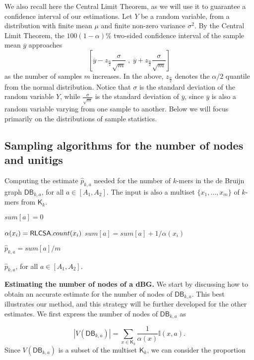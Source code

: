 \documentclass[a4paper,11pt]{article}
\newcommand{\DB}{\mathsf{DB}_{k,a}}
\newcommand{\K}{\mathsf{K}}
\newcommand{\abu}{\alpha}
\newcommand{\RLCSA}{{\sf RLCSA}}
\begin{document}
We also recall here the Central Limit Theorem, as we will use it to guarantee a confidence interval of our estimations. Let $Y$ be a random variable, from a distribution with finite mean $\mu$ and finite non-zero variance $\sigma^2$. By the Central Limit Theorem, the $100(1-\alpha)\%$ two-sided confidence interval of the sample mean $\overline{y}$ approaches 
\[\left[\overline{y} - z_{\frac{\alpha}{2}}\frac{\sigma}{\sqrt{m}} \;, \; \overline{y} + z_{\frac{\alpha}{2}}\frac{\sigma}{\sqrt{m}}\right] \]
as the number of samples $m$ increases. In the above, $z_{\frac{\alpha}{2}}$ denotes the $\alpha/2$ quantile from the normal distribution. Notice that $\sigma$ is the standard deviation of the random variable $Y$, while $\frac{\sigma}{\sqrt{m}}$ is the standard deviation of $\overline{y}$, since $\overline{y}$ is also a random variable varying from one sample to another. Below we will focus primarily on the distributions of sample statistics.


\subsection{Sampling algorithms for the number of nodes and unitigs} %
\label{sub:algorithm}

\begin{algorithm}[t]
\caption{Computing the estimate $\hat{p}_{k,a}$ needed for the number of $k$-mers in the de Bruijn graph $\DB$, for all $a \in [A_1,A_2]$. The input is also a multiset $\{x_1,\dots,x_m\}$ of $k$-mers from $\K_k$.\label{alg:graph-nodes}}

{
	$sum[a] = 0$\;
}

{
	$\abu(x_i) = \RLCSA.count(x_i)$\;
	\For{$a = A_1$ {\rm\bf to} $\min(\abu(x_i),A_2)$}
	{
		$sum[a] = sum[a] + 1 / \abu(x_i)$\;
	}
}

{
	$\hat{p}_{k,a} = sum[a]/m$\;
}

\Return $\hat{p}_{k,a}$, for all $a \in [A_1,A_2]$.
\end{algorithm}


\noindent \textbf{Estimating the number of nodes of a dBG.} We start by discussing how to obtain an accurate estimate for the number of nodes of $\DB$. This best illustrates our method, and this strategy will be further developed for the other estimates. We first express the number of nodes of $\DB$ as

\[|V(\DB)| = \sum_{x \in \K_k} \frac{1}{\abu(x)}\mathbb{I}(x,a).\]
Since $V(\DB)$ is a subset of the multiset $\K_k$, we can consider the proportion 
\end{document}
